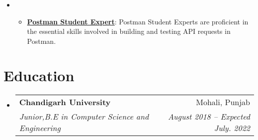 \documentclass[letterpaper,11pt]{article}
\makeatletter
\newcommand{\resumeItem}[1]{
  \item\small{
    {#1 \vspace{-2pt}}
  }
}
\newcommand{\resumeSubheading}[4]{
  \vspace{-2pt}\item
    \begin{tabular*}{0.97\textwidth}[t]{l@{\extracolsep{\fill}}r}
      \textbf{#1} & #2 \\
      \textit{\small#3} & \textit{\small #4} \\
    \end{tabular*}\vspace{-7pt}
}
\newcommand{\resumeSubHeadingListStart}{\begin{itemize}[leftmargin=0.15in, label={}]}
\newcommand{\resumeSubHeadingListEnd}{\end{itemize}}
\newcommand{\resumeItemListStart}{\begin{itemize}}
\newcommand{\resumeItemListEnd}{\end{itemize}\vspace{-5pt}}
\makeatother
\begin{document}
 \begin{itemize}[leftmargin=0.15in, label={}]
    \small\item{\resumeItemListStart
           \resumeItem{\textbf{\href{https://badgr.com/public/assertions/nfX4O89DRPevyH1r0tMyBQ?identity__email=souvikde.ns@gmail.com}{Postman Student Expert}}: Postman Student Experts are proficient in the essential skills involved in building and testing API requests in Postman. }
      \resumeItemListEnd
    }
 \end{itemize}
 
\section{Education}
  \resumeSubHeadingListStart
    \resumeSubheading
      {Chandigarh University}{Mohali, Punjab}
      {Junior,B.E in Computer Science and Engineering}{August 2018 -- Expected July. 2022}
  \resumeSubHeadingListEnd
\end{document}
